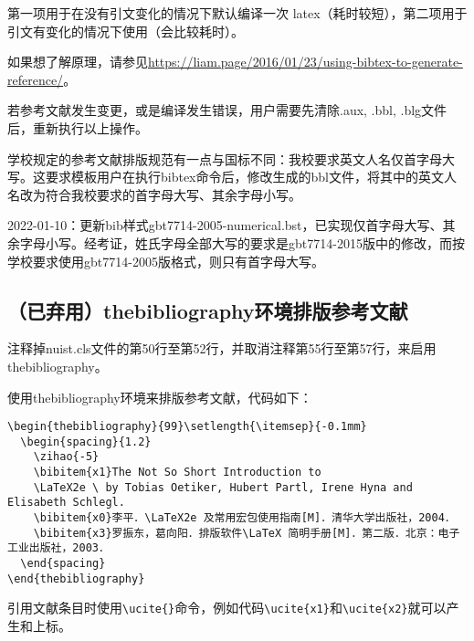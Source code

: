 第一项用于在没有引文变化的情况下默认编译一次 latex（耗时较短），第二项用于引文有变化的情况下使用（会比较耗时）。

如果想了解原理，请参见\url{https://liam.page/2016/01/23/using-bibtex-to-generate-reference/}。

若参考文献发生变更，或是编译发生错误，用户需要先清除.aux, .bbl, .blg文件后，重新执行以上操作。

学校规定的参考文献排版规范有一点与国标不同：我校要求英文人名仅首字母大写。这要求模板用户在执行bibtex命令后，修改生成的bbl文件，将其中的英文人名改为符合我校要求的首字母大写、其余字母小写。

{
\color{blue}
2022-01-10：更新bib样式gbt7714-2005-numerical.bst，已实现仅首字母大写、其余字母小写。经考证，姓氏字母全部大写的要求是gbt7714-2015版中的修改，而按学校要求使用gbt7714-2005版格式，则只有首字母大写。\cite{陈浩元2015GB}
}

\subsection{（已弃用）thebibliography环境排版参考文献}

注释掉nuist.cls文件的第50行至第52行，并取消注释第55行至第57行，来启用thebibliography。

使用thebibliography环境来排版参考文献，代码如下：

{
\color{green!50!black}
\begin{lstlisting}[breaklines=true,]
\begin{thebibliography}{99}\setlength{\itemsep}{-0.1mm}
  \begin{spacing}{1.2}
    \zihao{-5}
    \bibitem{x1}The Not So Short Introduction to 
    \LaTeX2e \ by Tobias Oetiker, Hubert Partl, Irene Hyna and Elisabeth Schlegl.
    \bibitem{x0}李平．\LaTeX2e 及常用宏包使用指南[M]．清华大学出版社，2004．
    \bibitem{x3}罗振东，葛向阳．排版软件\LaTeX 简明手册[M]．第二版．北京：电子工业出版社，2003．
  \end{spacing}
\end{thebibliography}
\end{lstlisting}
}

引用文献条目时使用\verb|\ucite{}|命令，例如代码\verb|\ucite{x1}|和\verb|\ucite{x2}|就可以产生\cite{x1}和\cite{x2}上标。
